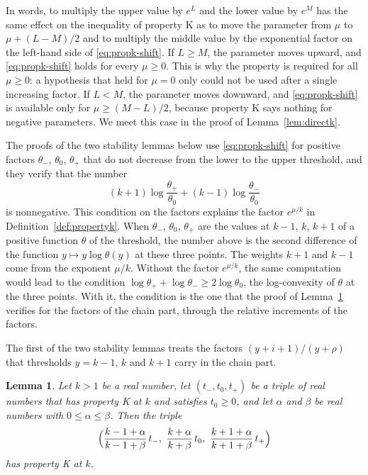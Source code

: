 \documentclass{amsart}
\newtheorem{lemma}[theorem]{Lemma}
\theoremstyle{definition}
\theoremstyle{remark}
\numberwithin{equation}{section}
\begin{document}
In words, to multiply the upper value by $e^{L}$ and the lower value by
$e^{M}$ has the same effect on the inequality of property K as to move the
parameter from $\mu$ to $\mu+(L-M)/2$ and to multiply the middle value by
the exponential factor on the left-hand side of \eqref{eq:propk-shift}. If
$L\ge M$, the parameter moves upward, and \eqref{eq:propk-shift}
holds for every $\mu\ge0$. This is why the property is required for all
$\mu\ge0$: a hypothesis that held for $\mu=0$ only could not be used after a
single increasing factor. If $L<M$, the parameter moves downward, and
\eqref{eq:propk-shift} is available only for $\mu\ge(M-L)/2$, because
property K says nothing for negative parameters. We meet this case in
the proof of Lemma~\ref{lem:directk}.

The proofs of the two stability lemmas below use \eqref{eq:propk-shift} for
positive factors $\theta_-$, $\theta_0$, $\theta_+$ that do not decrease
from the lower to the upper threshold, and they verify that the number
\[
(k+1)\log\frac{\theta_+}{\theta_0}+(k-1)\log\frac{\theta_-}{\theta_0}
\]
is nonnegative. This condition on the factors explains the factor
$e^{\mu/k}$ in Definition~\ref{def:propertyk}. When $\theta_-$, $\theta_0$,
$\theta_+$ are the values at $k-1$, $k$, $k+1$ of a positive function
$\theta$ of the threshold, the number above is the
second difference of the function $y\mapsto y\log\theta(y)$ at these three
points. The weights $k+1$ and $k-1$ come from the exponent $\mu/k$. Without
the factor $e^{\mu/k}$, the same computation would lead to the condition
$\log\theta_++\log\theta_-\ge2\log\theta_0$, the log-convexity of $\theta$
at the three points. With it, the condition is the one that the proof of
Lemma~\ref{lem:quotientfactor} verifies for the factors of the chain part,
through the relative increments of the factors.

The first of the two stability lemmas treats the factors
$(y+i+1)/(y+\rho)$ that thresholds $y=k-1$, $k$ and $k+1$ carry in the
chain part.

\begin{lemma}\label{lem:quotientfactor}
Let $k>1$ be a real number, let $(t_-,t_0,t_+)$ be a triple of real numbers
that has property K at $k$ and satisfies $t_0\ge0$, and let $\alpha$ and
$\beta$ be real numbers with $0\le\alpha\le\beta$. Then the triple
\[
\Bigl(\frac{k-1+\alpha}{k-1+\beta}\,t_-,\ \frac{k+\alpha}{k+\beta}\,t_0,
\ \frac{k+1+\alpha}{k+1+\beta}\,t_+\Bigr)
\]
has property K at $k$.
\end{lemma}
\end{document}
